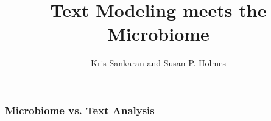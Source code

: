 \documentclass{beamer}
\title{Text Modeling meets the Microbiome}
\author{Kris Sankaran and Susan P. Holmes}
\institute{Department of Statistics, Stanford University}
\begin{document}
\begin{frame}
  \maketitle
\end{frame}

\begin{frame}
  \frametitle{Microbiome vs. Text Analysis}
  \begingroup
  \fontsize{10pt}{5pt}\selectfont
     
  \endgroup
\end{frame}
\end{document}
